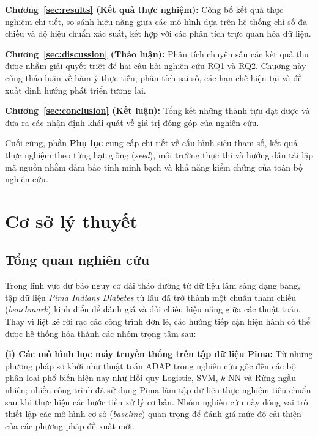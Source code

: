 \documentclass[14pt,a4paper]{extreport}
\begin{document}
\textbf{Chương~\ref{sec:results} (Kết quả thực nghiệm):} Công bố kết quả thực nghiệm chi tiết, so sánh hiệu năng giữa các mô hình dựa trên hệ thống chỉ số đa chiều và độ hiệu chuẩn xác suất, kết hợp với các phân tích trực quan hóa dữ liệu.

\textbf{Chương~\ref{sec:discussion} (Thảo luận):} Phân tích chuyên sâu các kết quả thu được nhằm giải quyết triệt để hai câu hỏi nghiên cứu RQ1 và RQ2. Chương này cũng thảo luận về hàm ý thực tiễn, phân tích sai số, các hạn chế hiện tại và đề xuất định hướng phát triển tương lai.

\textbf{Chương~\ref{sec:conclusion} (Kết luận):} Tổng kết những thành tựu đạt được và đưa ra các nhận định khái quát về giá trị đóng góp của nghiên cứu.

Cuối cùng, phần \textbf{Phụ lục} cung cấp chi tiết về cấu hình siêu tham số, kết quả thực nghiệm theo từng hạt giống (\textit{seed}), môi trường thực thi và hướng dẫn tái lập mã nguồn nhằm đảm bảo tính minh bạch và khả năng kiểm chứng của toàn bộ nghiên cứu.

\chapter{Cơ sở lý thuyết}
\label{sec:literature}

\section{Tổng quan nghiên cứu}

Trong lĩnh vực dự báo nguy cơ đái tháo đường từ dữ liệu lâm sàng dạng bảng, tập dữ liệu \emph{Pima Indians Diabetes} từ lâu đã trở thành một chuẩn tham chiếu (\textit{benchmark}) kinh điển để đánh giá và đối chiếu hiệu năng giữa các thuật toán.\cite{smith1988,uci-pima} Thay vì liệt kê rời rạc các công trình đơn lẻ, các hướng tiếp cận hiện hành có thể được hệ thống hóa thành các nhóm trọng tâm sau:

\textbf{(i) Các mô hình học máy truyền thống trên tập dữ liệu Pima:} Từ những phương pháp sơ khởi như thuật toán ADAP trong nghiên cứu gốc đến các bộ phân loại phổ biến hiện nay như Hồi quy Logistic, SVM, $k$-NN và Rừng ngẫu nhiên; nhiều công trình đã sử dụng Pima làm tập dữ liệu thực nghiệm tiêu chuẩn sau khi thực hiện các bước tiền xử lý cơ bản.\cite{smith1988,sisodia2018,chang2022pima,miao2021pima} Nhóm nghiên cứu này đóng vai trò thiết lập các mô hình cơ sở (\textit{baseline}) quan trọng để đánh giá mức độ cải thiện của các phương pháp đề xuất mới.
\end{document}
